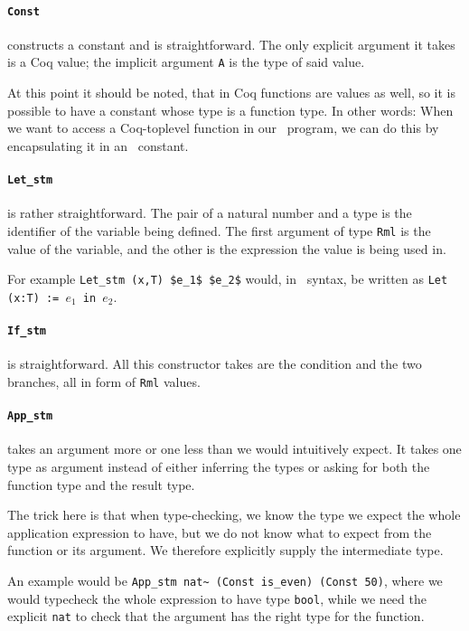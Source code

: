 \documentclass[11pt, leqno, titlepage]{article}
\def\coqe{\lstinline[language=Coq, basicstyle=\small]}
\theoremstyle{definition}
\begin{document}
\paragraph{\coqe{Const}} constructs a constant and is straightforward. The only explicit
argument it takes is a Coq value; the implicit argument \texttt{A} is the type of
said value.

At this point it should be noted, that in Coq functions are values as well, so it is
possible to have a constant whose type is a function type. In other words: When we
want to access a Coq-toplevel function in our \rmlx\ program, we can do this by
encapsulating it in an \rmlx\ constant. 

\paragraph{\coqe{Let_stm}} is rather straightforward. The pair of a natural number and a
type is the identifier of the variable being defined. The first argument of type
\coqe{Rml} is the value of the variable, and the other is the expression the value is
being used in.

For example \coqe{Let_stm (x,T) $e_1$ $e_2$} would, in \rml\ syntax, be written as
\texttt{Let (x:T) := $e_1$ in $e_2$}. 

\paragraph{\coqe{If_stm}} is straightforward. All this constructor takes are the condition
and the two branches, all in form of \coqe{Rml} values.

\paragraph{\coqe{App_stm}} takes an argument more or one less than we would
intuitively expect. It takes one type as argument instead of either inferring the
types or asking for both the function type and the result type.

The trick here is that when type-checking, we know the type we expect the whole application
expression to have, but we do not know what to expect from the function or its
argument. We therefore explicitly supply the intermediate type. 

An example would be \coqe{App_stm nat~ (Const is_even) (Const 50)}, where we would
typecheck the whole expression to have type \coqe{bool}, while we need the explicit
\coqe{nat} to check that the argument has the right type for the function.
\end{document}
